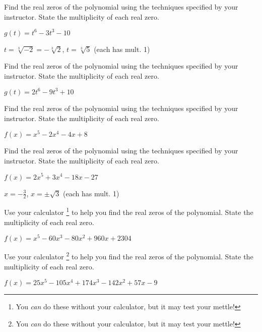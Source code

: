 \documentclass{ximera}
\begin{document}
\begin{problem}
Find the real zeros of the polynomial using the techniques specified by your instructor.  State the multiplicity of each real zero.

$g(t) = t^6-3t^3-10$

\begin{solution}
$t = \sqrt[3]{-2} = -\sqrt[3]{2}$, $t = \sqrt[3]{5}$ (each has mult. 1)
\end{solution}
\end{problem}

\begin{problem}
Find the real zeros of the polynomial using the techniques specified by your instructor.  State the multiplicity of each real zero.

$g(t) = 2t^6-9t^3+10$
\end{problem}

\begin{problem}
Find the real zeros of the polynomial using the techniques specified by your instructor.  State the multiplicity of each real zero.

$f(x) = x^5-2x^4-4x+8$
\end{problem}

\begin{problem}\label{findrealzerosexerlast}
Find the real zeros of the polynomial using the techniques specified by your instructor.  State the multiplicity of each real zero.

$f(x) = 2x^5+3x^4-18x-27$ 
\begin{solution}
$x = -\frac{3}{2}$, $x = \pm \sqrt{3}$ (each has mult. 1)
\end{solution}
\end{problem}

\begin{problem}\label{realzeroswcalcfirst}
Use your calculator \footnote{You \textit{can} do these without your calculator, but it may test your mettle!} to help you find the real zeros of the polynomial.  State the multiplicity of each real zero.

$f(x) = x^{5} - 60x^{3} - 80x^{2} + 960x + 2304$
\end{problem}

\begin{problem}
Use your calculator \footnote{You \textit{can} do these without your calculator, but it may test your mettle!} to help you find the real zeros of the polynomial.  State the multiplicity of each real zero.

$f(x) = 25x^{5} - 105x^{4} + 174x^{3} - 142x^{2} + 57x - 9$
\end{problem}
\end{document}
